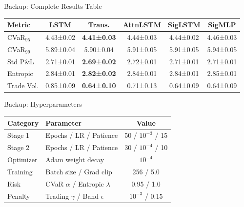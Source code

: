 \documentclass[aspectratio=169,11pt]{beamer}
\begin{document}
\begin{frame}{Backup: Complete Results Table}
\small
\begin{table}
\begin{tabular}{lccccc}
\toprule
\textbf{Metric} & \textbf{LSTM} & \textbf{Trans.} & \textbf{AttnLSTM} & \textbf{SigLSTM} & \textbf{SigMLP} \\
\midrule
CVaR$_{95}$ & 4.43±0.02 & \textbf{4.41±0.03} & 4.44±0.03 & 4.44±0.02 & 4.46±0.03 \\
CVaR$_{99}$ & 5.89±0.04 & 5.90±0.04 & 5.91±0.05 & 5.91±0.05 & 5.94±0.05 \\
Std P\&L & 2.71±0.01 & \textbf{2.69±0.02} & 2.72±0.01 & 2.71±0.01 & 2.71±0.01 \\
Entropic & 2.84±0.01 & \textbf{2.82±0.02} & 2.84±0.01 & 2.84±0.01 & 2.85±0.01 \\
Trade Vol. & 0.85±0.09 & \textbf{0.64±0.10} & 0.71±0.13 & 0.64±0.09 & 0.64±0.09 \\
\bottomrule
\end{tabular}
\end{table}
\end{frame}

\begin{frame}{Backup: Hyperparameters}
\begin{table}
\centering
\small
\begin{tabular}{llc}
\toprule
\textbf{Category} & \textbf{Parameter} & \textbf{Value} \\
\midrule
Stage 1 & Epochs / LR / Patience & 50 / $10^{-3}$ / 15 \\
Stage 2 & Epochs / LR / Patience & 30 / $10^{-4}$ / 10 \\
Optimizer & Adam weight decay & $10^{-4}$ \\
Training & Batch size / Grad clip & 256 / 5.0 \\
Risk & CVaR $\alpha$ / Entropic $\lambda$ & 0.95 / 1.0 \\
Penalty & Trading $\gamma$ / Band $\epsilon$ & $10^{-3}$ / 0.15 \\
\bottomrule
\end{tabular}
\end{table}
\end{frame}
\end{document}
